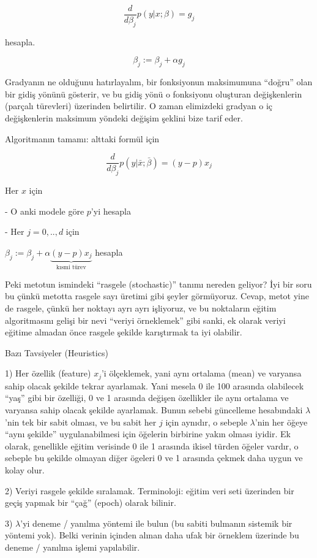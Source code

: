 \documentclass[12pt,fleqn]{article}\usepackage{../../common}
\begin{document}
$$
\frac{d}{d \beta_j} p(y|x;\beta) = g_j
$$

hesapla. 

$$
\beta_j := \beta_j + \alpha g_j
$$

Gradyanın ne olduğunu hatırlayalım, bir fonksiyonun maksimumuna ``doğru''
olan bir gidiş yönünü gösterir, ve bu gidiş yönü o fonksiyonu oluşturan
değişkenlerin (parçalı türevleri) üzerinden belirtilir. O zaman elimizdeki
gradyan o iç değişkenlerin maksimum yöndeki değişim şeklini bize tarif
eder. 

Algoritmanın tamamı: alttaki formül için

$$ \frac{d}{d \beta_j}p(y|\bar{x};\bar{\beta}) = (y-p)x_j $$

Her $x$ için

- O anki modele göre $p$'yi hesapla

- Her $j = 0,..,d$ için

$\beta_j := \beta_j + \alpha \underbrace{ (y-p) x_j}_{\textrm{kısmi türev}}$ hesapla
  
Peki metotun ismindeki ``rasgele (stochastic)'' tanımı nereden geliyor? İyi
bir soru bu çünkü metotta rasgele sayı üretimi gibi şeyler
görmüyoruz. Cevap, metot yine de rasgele, çünkü her noktayı ayrı ayrı
işliyoruz, ve bu noktaların eğitim algoritmasını gelişi bir nevi ``veriyi
örneklemek'' gibi sanki, ek olarak veriyi eğitime almadan önce rasgele
şekilde karıştırmak ta iyi olabilir. 

Bazı Tavsiyeler (Heuristics)

1) Her özellik (feature) $x_j$'i ölçeklemek, yani aynı ortalama (mean) ve
varyansa sahip olacak şekilde tekrar ayarlamak. Yani mesela 0 ile 100
arasında olabilecek ``yaş'' gibi bir özelliği, 0 ve 1 arasında değişen
özellikler ile aynı ortalama ve varyansa sahip olacak şekilde
ayarlamak. Bunun sebebi güncelleme hesabındaki $\lambda$'nin tek bir sabit
olması, ve bu sabit her $j$ için aynıdır, o sebeple $\lambda$'nin her öğeye
``aynı şekilde'' uygulanabilmesi için öğelerin birbirine yakın olması
iyidir. Ek olarak, genellikle eğitim verisinde 0 ile 1 arasında ikisel
türden öğeler vardır, o sebeple bu şekilde olmayan diğer ögeleri 0 ve 1
arasında çekmek daha uygun ve kolay olur.

2) Veriyi rasgele şekilde sıralamak. Terminoloji: eğitim veri seti
üzerinden bir geçiş yapmak bir ``çağ'' (epoch) olarak bilinir. 

3) $\lambda$'yi deneme / yanılma yöntemi ile bulun (bu sabiti bulmanın
sistemik bir yöntemi yok). Belki verinin içinden alınan daha ufak bir
örneklem üzerinde bu deneme / yanılma işlemi yapılabilir.
\end{document}
